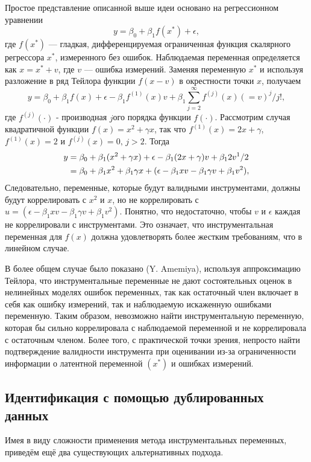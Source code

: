 Простое представление описанной выше идеи основано на регрессионном уравнении
\begin{equation}
y=\beta_0 +\beta_1 f(x^*)+ \epsilon,
\end{equation}
где $f(x^*)$ --- гладкая, дифференцируемая ограниченная функция скалярного регрессора $x^*$, измеренного без ошибок. Наблюдаемая переменная определяется как $x=x^*+v$, где $v$ --– ошибка измерений. Заменяя переменную $x^*$ и используя разложение в ряд Тейлора функции $f(x-v)$ в окрестности точки $x$, получаем
\begin{equation}
y=\beta_0 +\beta_1 f(x)+ \epsilon - \beta_1 f^{(1)}(x)v + \beta_1 \sum \limits^{\infty}_{j=2} f^{(j)}(x)(=v)^j/j!,
\end{equation}
где $f^{(j)}(\cdot)$ - производная $j$ого порядка функции $f(\cdot)$. Рассмотрим случая квадратичной функции $f(x)=x^2+\gamma x$, так что $f^{(1)}(x)=2x+ \gamma$, $f^{(1)}(x)=2$ и $f^{(j)}(x)=0, \, j>2$. Тогда
\begin{align}
y&=\beta_0 + \beta_1 (x^2+ \gamma x) + \epsilon - \beta_1 (2x+ \gamma)v + \beta_1 2v^1 /2 \notag \\
&= \beta_0 + \beta_1 x^2 + \beta_1 \gamma x + (\epsilon- \beta_1 xv - \beta_1 \gamma v + \beta_1 v^2),
\end{align}
Следовательно, переменные, которые будут валидными инструментами, должны будут коррелировать с $x^2$ и $x$, но не коррелировать с $u=(\epsilon- \beta_1 xv - \beta_1 \gamma v + \beta_1 v^2)$. Понятно, что недостаточно, чтобы $v$ и $\epsilon$ каждая не коррелировали с инструментами. Это означает, что инструментальная переменная для $f(x)$ должна удовлетворять более жестким требованиям, что в линейном случае.

В более общем случае было показано (Y. Amemiya), используя аппроксимацию Тейлора, что инструментальные переменные не дают состоятельных оценок в нелинейных моделях ошибок переменных, так как остаточный член включает в себя как ошибку измерений, так и наблюдаемую искаженную ошибками переменную. Таким образом, невозможно найти инструментальную переменную, которая бы сильно коррелировала с наблюдаемой переменной и не коррелировала с остаточным членом. Более того, с практической точки зрения, непросто найти подтверждение валидности инструмента при оценивании из-за ограниченности информации о латентной переменной $(x^*)$ и ошибках измерений.
 
\subsection{Идентификация с помощью дублированных данных} 
Имея в виду сложности применения метода инструментальных переменных, приведём ещё два существующих альтернативных подхода.

